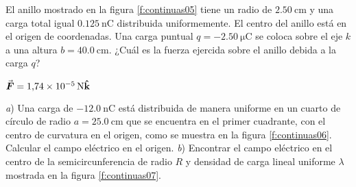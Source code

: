 %
\begin{center}
\end{center}
%
\begin{Exercise}\label{p:continuas05}
  El anillo mostrado en la figura \ref{f:continuas05} tiene un radio de $\SI{2.50}{\centi\metre}$ y una carga total igual $\SI{0.125}{\nano\coulomb}$ distribuida uniformemente. El centro del anillo está en el origen de coordenadas. Una carga puntual $q = \SI{-2.50}{\micro\coulomb}$ se coloca sobre el eje $k$ a una altura $b = \SI{40.0}{\centi\metre}$. ¿Cuál es la fuerza ejercida sobre el anillo debida a la carga $q$?
\end{Exercise}
\begin{Answer}
  $\va*{F} = \SI{1.74E-5}{\newton}\vu{k}$
\end{Answer}
%
\begin{center}
\end{center}
%
\begin{Exercise}\label{p:continuas06}
  \textbf{\raisebox{.5pt}{\textcircled{\raisebox{-1.2pt} {E}}}} \textit{a}) Una carga de $\SI{-12.0}{\nano\coulomb}$ está distribuida de manera uniforme en un cuarto de círculo de radio $a = \SI{25.0}{\centi\metre}$ que se encuentra en el primer cuadrante, con el centro de curvatura en el origen, como se muestra en la figura \ref{f:continuas06}. Calcular el campo eléctrico en el origen. \textit{b}) Encontrar el campo eléctrico en el centro de la semicircunferencia de radio $R$ y densidad de carga lineal uniforme $\lambda$ mostrada en la figura \ref{f:continuas07}.
\end{Exercise}
